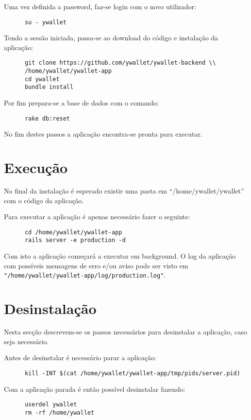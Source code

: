 \documentclass[12pt,a4paper]{article}
\begin{document}
  Uma vez definida a password, faz-se login com o novo utilizador:

  \begin{verbatim}
      su - ywallet
  \end{verbatim}

  Tendo a sessão iniciada, passa-se ao download do código e instalação da aplicação:

  \begin{verbatim}
      git clone https://github.com/ywallet/ywallet-backend \\
      /home/ywallet/ywallet-app
      cd ywallet
      bundle install
  \end{verbatim}

  Por fim prepara-se a base de dados com o comando:

  \begin{verbatim}
      rake db:reset
  \end{verbatim}

  No fim destes passos a aplicação encontra-se pronta para executar.


\section*{Execução}

  No final da instalação é esperado existir uma pasta em “/home/ywallet/ywallet” com o código da aplicação.

  Para executar a aplicação é apenas necessário fazer o seguinte:


  \begin{verbatim}
      cd /home/ywallet/ywallet-app
      rails server -e production -d
  \end{verbatim}

  Com isto a aplicação começará a executar em background. O log da aplicação com possíveis mensagens de erro e/ou aviso pode ser visto em \verb!"/home/ywallet/ywallet-app/log/production.log"!.



\section*{Desinstalação}

  Nesta secção descrevem-se os passos necessários para desinstalar a aplicação, caso seja necessário.

  Antes de desinstalar é necessário parar a aplicação:


  \begin{verbatim}
      kill -INT $(cat /home/ywallet/ywallet-app/tmp/pids/server.pid)
  \end{verbatim}

  Com a aplicação parada é então possível desinstalar fazendo:


  \begin{verbatim}
      userdel ywallet
      rm -rf /home/ywallet
  \end{verbatim}
\end{document}
